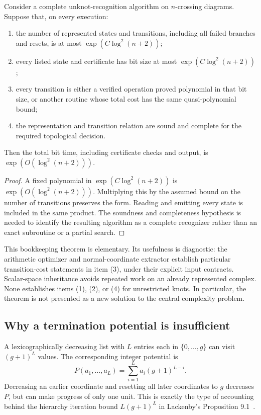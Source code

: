 \begin{theorem}
\label{thm:conditional-global}
Consider a complete unknot-recognition algorithm on $n$-crossing diagrams.
Suppose that, on every execution:
\begin{enumerate}
\item the number of represented states and transitions, including all
failed branches and resets, is at most $\exp(C\log^2(n+2))$;
\item every listed state and certificate has bit size at most
$\exp(C\log^2(n+2))$;
\item every transition is either a verified operation proved polynomial
in that bit size, or another routine whose total cost has the same
quasi-polynomial bound;
\item the representation and transition relation are sound and complete
for the required topological decision.
\end{enumerate}
Then the total bit time, including certificate checks and output, is
$\exp(O(\log^2(n+2)))$.
\end{theorem}
\begin{proof}
A fixed polynomial in $\exp(C\log^2(n+2))$ is
$\exp(O(\log^2(n+2)))$. Multiplying this by the assumed bound on the
number of transitions preserves the form. Reading and emitting every
state is included in the same product. The soundness and completeness
hypothesis is needed to identify the resulting algorithm as a complete
recognizer rather than an exact subroutine or a partial search.
\end{proof}

This bookkeeping theorem is elementary. Its usefulness is diagnostic:
the arithmetic optimizer and normal-coordinate extractor establish
particular transition-cost statements in item (3), under their explicit
input contracts. Scalar-space inheritance avoids repeated work on an
already represented complex. None establishes items (1), (2), or (4) for
unrestricted knots. In particular, the theorem is not presented as a
new solution to the central complexity problem.

\subsection{Why a termination potential is insufficient}

A lexicographically decreasing list with $L$ entries each in
$\{0,\ldots,g\}$ can visit $(g+1)^L$ values. The corresponding integer
potential is
\[
 P(a_1,\ldots,a_L)=\sum_{i=1}^L a_i(g+1)^{L-i}.
\]
Decreasing an earlier coordinate and resetting all later coordinates to
$g$ decreases $P$, but can make progress of only one unit. This is exactly
the type of accounting behind the hierarchy iteration bound
$L(g+1)^L$ in Lackenby's Proposition 9.1~\cite{lackenby2026}.

